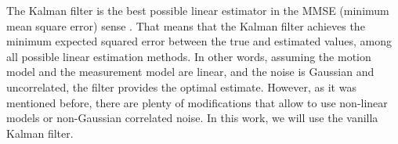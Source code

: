 The Kalman filter is the best possible linear estimator in the MMSE (minimum mean square error) sense \cite{humpherysFreshLookKalman2012}. That means that the Kalman filter achieves the minimum expected squared error between the true and estimated values, among all possible linear estimation methods. In other words, assuming the motion model and the measurement model are linear, and the noise is Gaussian and uncorrelated, the filter provides the optimal estimate. However, as it was mentioned before, there are plenty of modifications that allow to use non-linear models or non-Gaussian correlated noise. In this work, we will use the vanilla Kalman filter.

